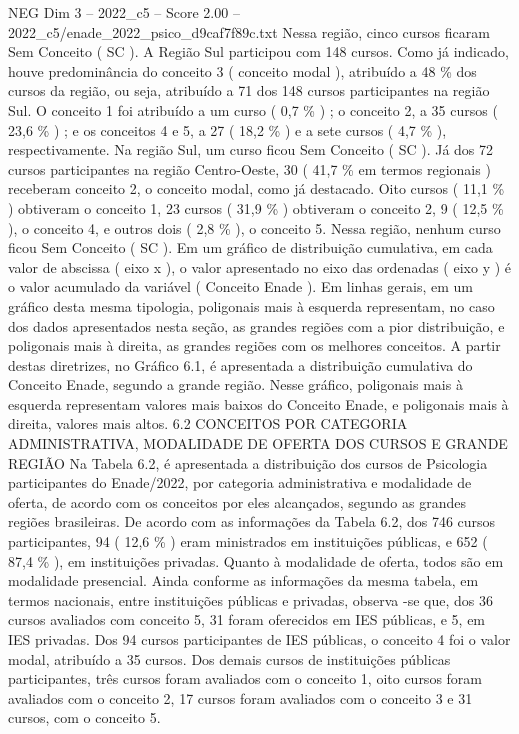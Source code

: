 \begin{textsample}{NEG Dim 3 – 2022\_c5 – Score 2.00 – 2022\_c5/enade\_2022\_psico\_d9caf7f89c.txt}
Nessa região, cinco cursos ficaram Sem Conceito ( SC ).
A Região Sul participou com 148 cursos.
Como já indicado, houve predominância do conceito 3 ( conceito modal ), atribuído a 48 \% dos cursos da região, ou seja, atribuído a 71 dos 148 cursos participantes na região Sul.
O conceito 1 foi atribuído a um curso ( 0,7 \% ) ; o conceito 2, a 35 cursos ( 23,6 \% ) ; e os conceitos 4 e 5, a 27 ( 18,2 \% ) e a sete cursos ( 4,7 \% ), respectivamente.
Na região Sul, um curso ficou Sem Conceito ( SC ).
Já dos 72 cursos participantes na região Centro-Oeste, 30 ( 41,7 \% em termos regionais ) receberam conceito 2, o conceito modal, como já destacado.
Oito cursos ( 11,1 \% ) obtiveram o conceito 1, 23 cursos ( 31,9 \% ) obtiveram o conceito 2, 9 ( 12,5 \% ), o conceito 4, e outros dois ( 2,8 \% ), o conceito 5.
Nessa região, nenhum curso ficou Sem Conceito ( SC ).
Em um gráfico de distribuição cumulativa, em cada valor de abscissa ( eixo x ), o valor apresentado no eixo das ordenadas ( eixo y ) é o valor acumulado da variável ( Conceito Enade ).
Em linhas gerais, em um gráfico desta mesma tipologia, poligonais mais à esquerda representam, no caso dos dados apresentados nesta seção, as grandes regiões com a pior distribuição, e poligonais mais à direita, as grandes regiões com os melhores conceitos.
A partir destas diretrizes, no Gráfico 6.1, é apresentada a distribuição cumulativa do Conceito Enade, segundo a grande região.
Nesse gráfico, poligonais mais à esquerda representam valores mais baixos do Conceito Enade, e poligonais mais à direita, valores mais altos. 6.2 CONCEITOS POR CATEGORIA ADMINISTRATIVA, MODALIDADE DE OFERTA DOS CURSOS E GRANDE REGIÃO Na Tabela 6.2, é apresentada a distribuição dos cursos de Psicologia participantes do Enade/2022, por categoria administrativa e modalidade de oferta, de acordo com os conceitos por eles alcançados, segundo as grandes regiões brasileiras.
De acordo com as informações da Tabela 6.2, dos 746 cursos participantes, 94 ( 12,6 \% ) eram ministrados em instituições públicas, e 652 ( 87,4 \% ), em instituições privadas.
Quanto à modalidade de oferta, todos são em modalidade presencial.
Ainda conforme as informações da mesma tabela, em termos nacionais, entre instituições públicas e privadas, observa -se que, dos 36 cursos avaliados com conceito 5, 31 foram oferecidos em IES públicas, e 5, em IES privadas.
Dos 94 cursos participantes de IES públicas, o conceito 4 foi o valor modal, atribuído a 35 cursos.
Dos demais cursos de instituições públicas participantes, três cursos foram avaliados com o conceito 1, oito cursos foram avaliados com o conceito 2, 17 cursos foram avaliados com o conceito 3 e 31 cursos, com o conceito 5.

\end{textsample}
